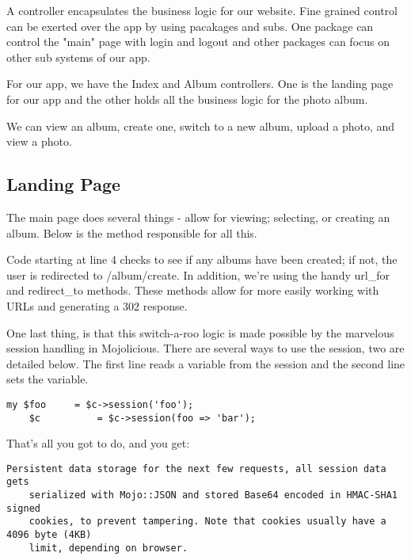 \documentclass[14pt]{extreport}
\newcommand\Small{\fontsize{12}{13.0}\fontencoding{T1}\selectfont}
\newcommand*\LSTfont{\Small\ttfamily\SetTracking{encoding=*}{-60}\lsstyle}
\begin{document}
A controller encapsulates the business logic for our website.  Fine grained
control can be exerted over the app by using pacakages and subs.  One package
can control the "main" page with login and logout and other packages can focus
on other sub systems of our app.

For our app, we have the Index and Album controllers.  One is the landing page for
our app and the other holds all the business logic for the photo album.

We can view an album, create one, switch to a new album, upload a photo, and
view a photo.

\subsection{Landing Page}

The main page does several things - allow for viewing; selecting, or creating
an album.  Below is the method responsible for all this.



Code starting at line 4 checks to see if any albums have been created; if not,
the user is redirected to /album/create.  In addition, we're using the handy
url\_for and redirect\_to methods. These methods allow for more easily working
with URLs and generating a 302 response.

One last thing, is that this switch-a-roo logic is made possible by the
marvelous session handling in Mojolicious.  There are several ways to use the
session, two are detailed below.  The first line reads a variable from the
session and the second line sets the variable.

\begin{lstlisting}[style=BlockStyle]
    my $foo     = $c->session('foo');
    $c          = $c->session(foo => 'bar');
\end{lstlisting}

That's all you got to do, and you get:

\begin{lstlisting}[style=BlockStyle]
    Persistent data storage for the next few requests, all session data gets
    serialized with Mojo::JSON and stored Base64 encoded in HMAC-SHA1 signed
    cookies, to prevent tampering. Note that cookies usually have a 4096 byte (4KB)
    limit, depending on browser.
\end{lstlisting}
\end{document}
